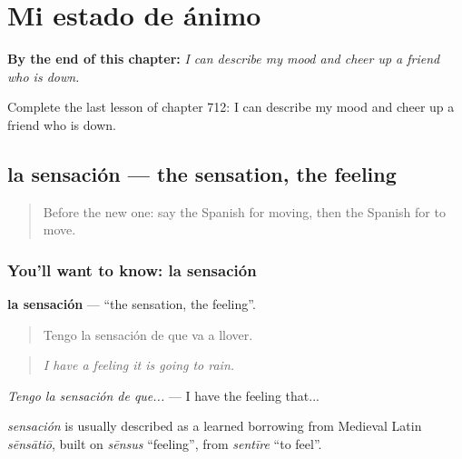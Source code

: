 
\chapter{Mi estado de ánimo}
\label{ch:es-mi-estado-de-animo}

\begin{chapteropening}
\textbf{By the end of this chapter:} \emph{I can describe my mood and cheer up a friend who is down.}

Complete the last lesson of chapter 712: I can describe my mood and cheer up a friend who is down.
\end{chapteropening}

\section[la sensación]{la sensación — the sensation, the feeling}

\label{lesson:ES-C712-sensacion}



\begin{quote}
Before the new one: say the Spanish for moving, then the Spanish for to move.
\end{quote}

\subsection*{You'll want to know: la sensación}
\textbf{la sensación} — \textquotedblleft{}the sensation, the feeling\textquotedblright{}.

\begin{quote}
Tengo la sensación de que va a llover.
\end{quote}

\begin{quote}
\emph{I have a feeling it is going to rain.}
\end{quote}

\emph{Tengo la sensación de que...} — I have the feeling that...

\begin{cousinweb}
\emph{sensación} is usually described as a learned borrowing from Medieval Latin \emph{sēnsātiō}, built on \emph{sēnsus} \textquotedblleft{}feeling\textquotedblright{}, from \emph{sentīre} \textquotedblleft{}to feel\textquotedblright{}.
\end{cousinweb}

